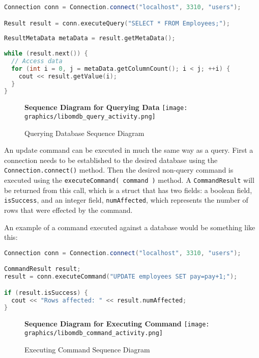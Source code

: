 \documentclass[letterpaper, 12pt]{article}
\begin{document}
  \begin{lstlisting}[language=C++]
Connection conn = Connection.connect("localhost", 3310, "users"); 

Result result = conn.executeQuery("SELECT * FROM Employees;");
		
ResultMetaData metaData = result.getMetaData();	
	
while (result.next()) {
  // Access data
  for (int i = 0, j = metaData.getColumnCount(); i < j; ++i) {
    cout << result.getValue(i);	  	
  }
}
  \end{lstlisting}
  \par\vspace{\baselineskip}
  
  \begin{figure}
    \centering
    \textbf{Sequence Diagram for Querying Data}
    \texttt{[image: graphics/libomdb\_query\_activity.png]}
    \caption{Querying Database Sequence Diagram}
  \end{figure}
  \par\vspace{\baselineskip}
    
  An update command can be executed in much the same way as a query. First 
  a connection needs to be established to the desired database using the 
  \lstinline|Connection.connect()| method. Then the desired non-query 
  command is executed using the \lstinline|executeCommand( command )| method.
  A \lstinline|CommandResult| will be returned from this call,
  which is a struct that has two fields: a boolean field,
  \lstinline|isSuccess|, and an integer field,
  \lstinline|numAffected|, which represents the number of rows 
  that were effected by the command.
  \par\vspace{\baselineskip}
  An example of a command executed against a database would be something like this:
  \begin{lstlisting}[language=C++]
Connection conn = Connection.connect("localhost", 3310, "users");

CommandResult result;
result = conn.executeCommand("UPDATE employees SET pay=pay+1;");

if (result.isSuccess) {
  cout << "Rows affected: " << result.numAffected;	
}
  \end{lstlisting}

  \begin{figure}
    \centering
    \textbf{Sequence Diagram for Executing Command}
    \texttt{[image: graphics/libomdb\_command\_activity.png]}
    \caption{Executing Command Sequence Diagram}
  \end{figure}    
  
\end{document}
